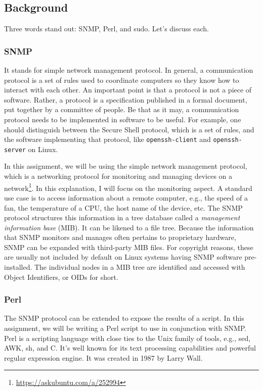 \documentclass{article}
\begin{document}

\subsection{Background}

Three words stand out: SNMP, Perl, and sudo. Let's discuss each.

\subsubsection{SNMP}

It stands for simple network management protocol.  In general, a communication
protocol is a set of rules used to coordinate computers so they know how to
interact with each other. An important point is that a protocol is not a piece
of software.  Rather, a protocol is a specification published in a formal
document, put together by a committee of people.  Be that as it may, a
communication protocol needs to be implemented in software to be useful.  For
example, one should distinguish between  the Secure Shell protocol, which is a
set of rules, and the software implementing that protocol, like
\verb|openssh-client| and \verb|openssh-server| on Linux.

In this assignment, we will be using the simple network management protocol,
which is a networking protocol for monitoring and managing devices on a
%
network\footnote{\url{https://askubuntu.com/a/252994}}.
%
In this explanation, I will focus on the monitoring aspect.  A standard use case
is to access information about a remote computer, e.g., the speed of a fan, the
temperature of a CPU, the host name of the device, etc.  The SNMP protocol
structures this information in a tree database called a \emph{management
information base} (MIB). It can be likened to a file tree. Because the
information that SNMP monitors and manages often pertains to proprietary
hardware, SNMP can be expanded with third-party MIB files. For copyright
reasons, these are usually not included by default on Linux systems having SNMP
software pre-installed. The individual nodes in a MIB tree are identified and
accessed with Object Identifiers, or OIDs for short.

\subsubsection{Perl}

The SNMP protocol can be extended to expose the results of a script. In this
assignment, we will be writing a Perl script to use in conjunction with SNMP.
Perl is a scripting language with close ties to the Unix family of tools, e.g.,
sed, AWK, sh, and C. It's well known for its text processing capabilities and
powerful regular expression engine. It was created in 1987 by Larry Wall.
\end{document}
